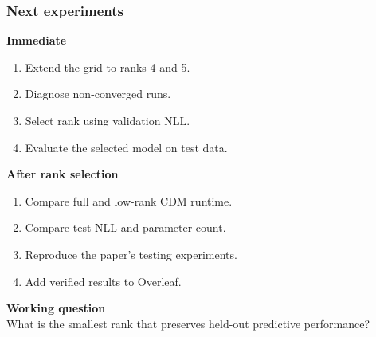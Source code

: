\documentclass[white,aspect-ratio=16:9]{uom_ltx_talk_casson}
\newcommand{\sectionemphasis}[1]{\textcolor{IITMBlue}{\textbf{#1}}}
\begin{document}
\begin{frame}
  \frametitle{Next experiments}
  \begin{minipage}[t]{0.47\textwidth}
    \vspace{0pt}
    \sectionemphasis{Immediate}
    \begin{enumerate}
      \item Extend the grid to ranks 4 and 5.
      \item Diagnose non-converged runs.
      \item Select rank using validation NLL.
      \item Evaluate the selected model on test data.
    \end{enumerate}
  \end{minipage}
  \hfill
  \begin{minipage}[t]{0.47\textwidth}
    \vspace{0pt}
    \sectionemphasis{After rank selection}
    \begin{enumerate}
      \item Compare full and low-rank CDM runtime.
      \item Compare test NLL and parameter count.
      \item Reproduce the paper's testing experiments.
      \item Add verified results to Overleaf.
    \end{enumerate}
  \end{minipage}
  \vfill
  \centering
  \colorbox{IITMLightBlue}{\parbox{0.76\textwidth}{\centering\large\textbf{Working question}\\[0.12cm]What is the smallest rank that preserves held-out predictive performance?}}
\end{frame}
\end{document}
